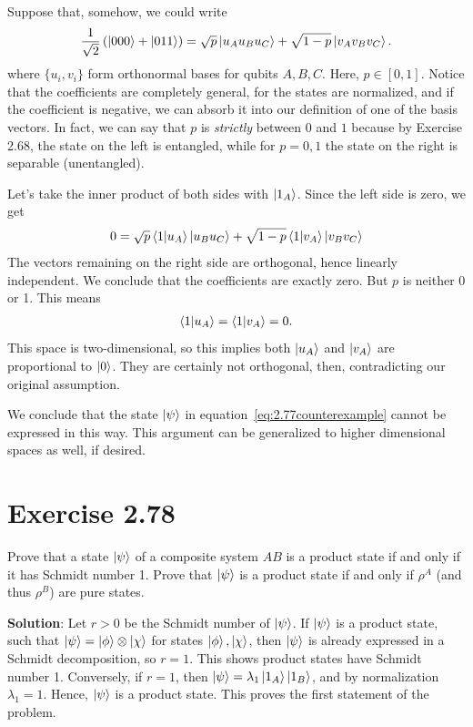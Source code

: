 \documentclass{book}
\begin{document}
    Suppose that, somehow, we could write
    \begin{align}
        \frac{1}{\sqrt{2}} \left(\ket{000} + \ket{011}\right) = \sqrt{p} \ket{u_A u_B u_C} + \sqrt{1-p} \ket{v_A v_B v_C}.
    \end{align}
    where $\{u_i, v_i\}$ form orthonormal bases for qubits $A, B, C$. Here, $p \in [0,1]$. Notice that the coefficients are completely general, for the states are normalized, and if the coefficient is negative, we can absorb it into our definition of one of the basis vectors. In fact, we can say that $p$ is \emph{strictly} between $0$ and $1$ because by Exercise 2.68, the state on the left is entangled, while for $p = 0,1$ the state on the right is separable (unentangled). 

    Let's take the inner product of both sides with $\ket{1_A}$. Since the left side is zero, we get
    \begin{align}
        0 = \sqrt{p} \bra{1}\ket{u_A} \ket{u_B u_C} + \sqrt{1-p} \bra{1}\ket{v_A} \ket{v_B v_C}
    \end{align}
    The vectors remaining on the right side are orthogonal, hence linearly independent. We conclude that the coefficients are exactly zero. But $p$ is neither 0 or 1. This means
    \begin{align}
        \bra{1}\ket{u_A} = \bra{1}\ket{v_A} = 0.
    \end{align}
    This space is two-dimensional, so this implies both $\ket{u_A}$ and $\ket{v_A}$ are proportional to $\ket{0}$. They are certainly not orthogonal, then, contradicting our original assumption.

    We conclude that the state $\ket{\psi}$ in equation~\eqref{eq:2.77counterexample} cannot be expressed in this way. This argument can be generalized to higher dimensional spaces as well, if desired.

\section*{Exercise 2.78}
    Prove that a state $\ket{\psi}$ of a composite system $AB$ is a product state if and only if it has Schmidt number 1. Prove that $\ket{\psi}$ is a product state if and only if $\rho^A$ (and thus $\rho^B$) are pure states.

    \textbf{Solution}: Let $r > 0$ be the Schmidt number of $\ket{\psi}$. If $\ket{\psi}$ is a product state, such that $\ket{\psi} = \ket{\phi}\otimes \ket{\chi}$ for states $\ket{\phi}, \ket{\chi}$, then $\ket{\psi}$ is already expressed in a Schmidt decomposition, so $r = 1$. This shows product states have Schmidt number 1. Conversely, if $r = 1$, then $\ket{\psi} = \lambda_1 \ket{1_A}\ket{1_B}$, and by normalization $\lambda_1 = 1$. Hence, $\ket{\psi}$ is a product state. This proves the first statement of the problem.
\end{document}
